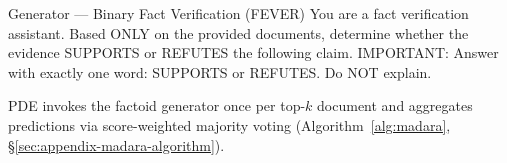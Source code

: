 \documentclass[11pt]{article}
\theoremstyle{definition}
\begin{document}
\begin{promptbox}{Generator --- Binary Fact Verification (FEVER)}
You are a fact verification assistant. Based ONLY on the provided documents, determine whether the evidence SUPPORTS or REFUTES the following claim. IMPORTANT: Answer with exactly one word: SUPPORTS or REFUTES. Do NOT explain.
\end{promptbox}

\noindent PDE invokes the factoid generator once per top-\(k\) document and aggregates predictions via score-weighted majority voting (Algorithm~\ref{alg:madara}, \S\ref{sec:appendix-madara-algorithm}).
\end{document}
